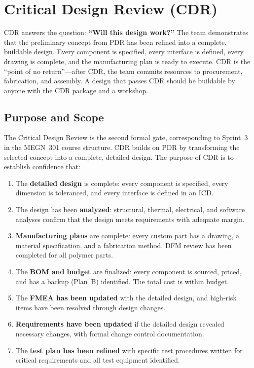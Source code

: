 \documentclass[11pt,letterpaper,twoside,openany]{book}
\begin{document}
\FloatBarrier
\chapter{Critical Design Review (CDR)}

\vspace{1em}

\begin{keyconceptbox}
CDR answers the question: \textbf{``Will this design work?''} The team demonstrates that the preliminary concept from PDR has been refined into a complete, buildable design. Every component is specified, every interface is defined, every drawing is complete, and the manufacturing plan is ready to execute. CDR is the ``point of no return''---after CDR, the team commits resources to procurement, fabrication, and assembly. A design that passes CDR should be buildable by anyone with the CDR package and a workshop.
\end{keyconceptbox}

\vspace{1em}

\FloatBarrier
\section{Purpose and Scope}

The Critical Design Review is the second formal gate, corresponding to Sprint~3 in the MEGN~301 course structure. CDR builds on PDR by transforming the selected concept into a complete, detailed design. The purpose of CDR is to establish confidence that:

\begin{enumerate}[leftmargin=1.5em]
\item The \textbf{detailed design} is complete: every component is specified, every dimension is toleranced, and every interface is defined in an ICD.
\item The design has been \textbf{analyzed}: structural, thermal, electrical, and software analyses confirm that the design meets requirements with adequate margin.
\item \textbf{Manufacturing plans} are complete: every custom part has a drawing, a material specification, and a fabrication method. DFM review has been completed for all polymer parts.
\item The \textbf{BOM and budget} are finalized: every component is sourced, priced, and has a backup (Plan~B) identified. The total cost is within budget.
\item The \textbf{FMEA has been updated} with the detailed design, and high-risk items have been resolved through design changes.
\item \textbf{Requirements have been updated} if the detailed design revealed necessary changes, with formal change control documentation.
\item The \textbf{test plan has been refined} with specific test procedures written for critical requirements and all test equipment identified.
\end{enumerate}
\end{document}
